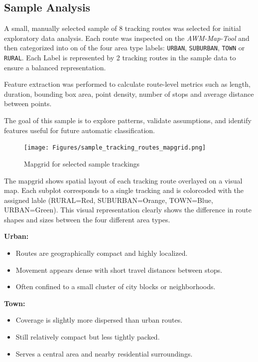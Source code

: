 \documentclass[a4paper,12pt,twoside]{scrreprt}
\begin{document}
\subsection{Sample Analysis}

A small, manually selected sample of 8 tracking routes was selected for initial
exploratory data analysis. Each route was inspected on the
\textit{AWM-Map-Tool} and
then categorized into on of the four area type labels: \texttt{URBAN},
\texttt{SUBURBAN}, \texttt{TOWN} or \texttt{RURAL}. Each Label is represented
by 2 tracking routes in the sample data to
ensure a balanced representation.

Feature extraction was performed to calculate route-level metrics such as
length, duration, bounding box area, point density, number of stops and average
distance between points.

The goal of this sample is to explore patterns, validate assumptions, and
identify features useful for future automatic classification.

\begin{figure}[htbp]
  \centering

  \texttt{[image: Figures/sample\_tracking\_routes\_mapgrid.png]}
  \caption{Mapgrid for selected sample trackings}
  \label{fig:sample_mapgrid}
\end{figure}
\FloatBarrier
The mapgrid shows spatial layout of each tracking route overlayed on a visual
map. Each subplot corresponds to a single tracking and is colorcoded with the
assigned lable (RURAL=Red, SUBURBAN=Orange, TOWN=Blue, URBAN=Green). This
visual representation clearly shows the difference in route shapes and sizes
between the four different area types.

\textbf{Urban:}
\begin{itemize}
  \item Routes are geographically compact and highly localized.
  \item Movement appears dense with short travel distances between stops.
  \item Often confined to a small cluster of city blocks or neighborhoods.
\end{itemize}

\textbf{Town:}
\begin{itemize}
  \item Coverage is slightly more dispersed than urban routes.
  \item Still relatively compact but less tightly packed.
  \item Serves a central area and nearby residential surroundings.
\end{itemize}
\end{document}
